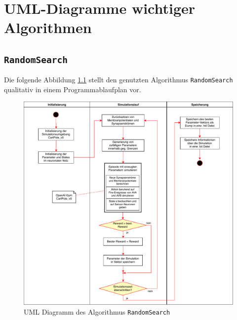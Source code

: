 \appendix
%
\chapter{UML-Diagramme wichtiger Algorithmen}
\label{app:UML}
%

	\section{\texttt{RandomSearch}}
	\label{app:UML_RS}
		Die folgende Abbildung \ref{fig:uml_rs} stellt den genutzten Algorithmus \texttt{RandomSearch} qualitativ in einem Programmablaufplan vor.
		\begin{figure}[H]
			\centering
			\includegraphics[width=14cm]{figures/appendix/uml_rs.pdf}
			\caption{UML Diagramm des Algorithmus \texttt{RandomSearch}}
			\label{fig:uml_rs}
		\end{figure}
	
